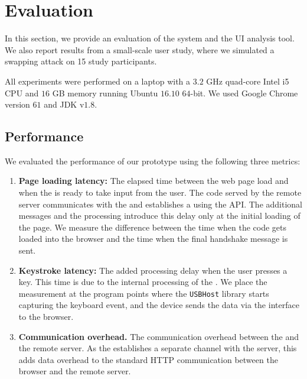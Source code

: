
\section{Evaluation}
\label{sec:results}

In this section, we provide an evaluation of the \name system and the \tool UI analysis tool. We also report results from a small-scale user study, where we simulated a swapping attack on 15 study participants.

 All experiments were performed on a laptop with a $3.2$ GHz quad-core Intel i5 CPU and $16$ GB memory running Ubuntu $16.10$ $64$-bit. We used Google Chrome version $61$ and JDK v$1.8$.

\subsection{\name Performance}
\label{sec:results:devicePerformance}

We evaluated the performance of our \device prototype using the following three metrics:

\begin{enumerate}
  \item \textbf{Page loading latency:} The elapsed time between the web page load and when the \device is ready to take input from the user. The \js code served by the remote server communicates with the \device and establishes a \tls using the \webusb API. The additional \tls messages and the \device processing introduce this delay only at the initial loading of the page. We measure the difference between the time when the \js code gets loaded into the browser and the time when the final \tls handshake message is sent.
  
  \item \textbf{Keystroke latency:} The added processing delay when the user presses a key. This time is due to the internal processing of the \device. We place the measurement at the program points where the \texttt{USBHost} library starts capturing the keyboard event, and the device sends the data via the \webusb interface to the browser.
  
  \item \textbf{Communication overhead.} The communication overhead between the \device and the remote server. As the \device establishes a separate \tls channel with the server, this adds data overhead to the standard HTTP communication between the browser and the remote server.
\end{enumerate}


